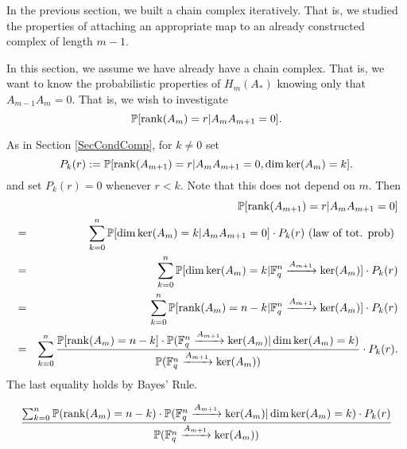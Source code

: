 In the previous section, we built a chain complex iteratively. That is, we
studied the properties of attaching an appropriate map to an already
constructed complex of length $m-1$. 

In this section, we assume we have already have a chain complex.  That is, we want to know the probabilistic properties of $H_m(A_\ast)$ knowing only that $A_{m-1}A_m=0$.  That is, we wish to investigate
\[
\mathbb{P}[\operatorname{\mathrm{rank}}(A_m) = r| A_{m}A_{m+1} = 0].
\] 

As in Section \ref{SecCondComp}, for $k\neq 0$ set
\[
P_k(r) :=  \mathbb{P}[\operatorname{\mathrm{rank}}(A_{m+1})=r|A_{m}A_{m+1} = 0, \dim\ker (A_{m}) = k].
\]
and set $P_k(r) = 0$ whenever $r<k$.
Note that this does not depend on $m$. Then
	\begin{eqnarray*}
	&&\mathbb{P}[\operatorname{\mathrm{rank}}(A_{m+1}) = r| A_{m}A_{m+1} = 0]\\
	&=& \sum_{k=0}^n \mathbb{P}[\dim\ker (A_{m}) = k|A_{m}A_{m+1} = 0]
    	\cdot P_k(r)  \textrm{ (law of tot. prob) }\\
	&=& \sum_{k=0}^n \mathbb{P}[\dim\ker (A_{m}) = k| \mathbb{F}_q^{n} \xrightarrow{A_{m+1}} \ker(A_{m})]
    	\cdot P_k(r)\\
	&=& \sum_{k=0}^n \mathbb{P}[\operatorname{\mathrm{rank}}(A_{m}) = n-k | \mathbb{F}_q^{n} \xrightarrow{A_{m+1}} \ker(A_{m})]
    	\cdot P_k(r)\\
    &=& \sum_{k=0}^n \frac{\mathbb{P}[\operatorname{\mathrm{rank}}(A_{m}) = n-k]
    \cdot \mathbb{P}(\mathbb{F}_q^{n} \xrightarrow{A_{m+1}} \ker(A_{m}) |\dim\ker(A_{m}) = k)}
    {\mathbb{P}(\mathbb{F}_q^{n} \xrightarrow{A_{m+1}} \ker(A_{m}))}
        \cdot P_k(r).
   \end{eqnarray*}
The last equality holds by Bayes' Rule. 

\[
  \frac{ \sum_{k=0}^n \mathbb{P}(\operatorname{\mathrm{rank}}(A_{m}) = n-k) \cdot \mathbb{P}(\mathbb{F}_q^{n} \xrightarrow{A_{m+1}} \ker(A_{m}) |\dim\ker(A_{m}) = k)
    \cdot P_k(r)}
    {\mathbb{P}(\mathbb{F}_q^{n} \xrightarrow{A_{m+1}} \ker(A_{m}))}
\]

